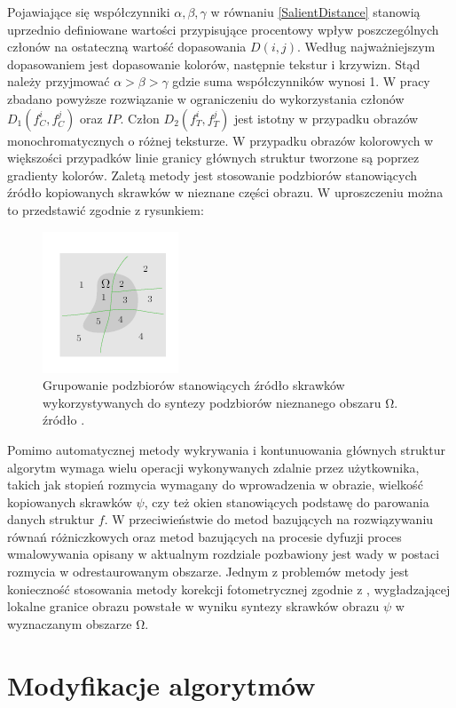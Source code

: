 \documentclass[12pt, twoside, openany]{report}
\theoremstyle{definition}
\begin{document}
Pojawiające się współczynniki $\alpha ,\beta ,\gamma $ w równaniu \eqref{SalientDistance} stanowią uprzednio definiowane wartości przypisujące procentowy wpływ poszczególnych członów na ostateczną wartość dopasowania $D(i,j)$. Według \cite{SalientStrucTexProp} najważniejszym dopasowaniem jest dopasowanie kolorów, następnie tekstur i krzywizn. Stąd należy przyjmować $\alpha >\beta >\gamma $ gdzie suma współczynników wynosi 1. W pracy zbadano powyższe rozwiązanie w ograniczeniu do wykorzystania członów $D_1\left(f^i_C,f^j_C\right)$ oraz $IP$. Człon $D_2\left(f^i_T,f^j_T\right)$ jest istotny w przypadku obrazów monochromatycznych o różnej teksturze. W przypadku obrazów kolorowych w większości przypadków linie granicy głównych struktur tworzone są poprzez gradienty kolorów. Zaletą metody jest stosowanie podzbiorów stanowiących źródło kopiowanych skrawków w nieznane części obrazu. W uproszczeniu można to przedstawić zgodnie z rysunkiem:
\begin{figure}[!h]
	\centering
	\includegraphics[scale=1]{rysunki/4_fig9}
	\caption{Grupowanie podzbiorów stanowiących źródło skrawków wykorzystywanych do syntezy podzbiorów nieznanego obszaru $\boldsymbol{\mathrm{\Omega }}$. źródło \cite{StructurePropagationManual}.}
\label{4_fig9}
\end{figure}
Pomimo automatycznej metody wykrywania i kontunuowania głównych struktur algorytm wymaga wielu operacji wykonywanych zdalnie przez użytkownika, takich jak stopień rozmycia wymagany do wprowadzenia w obrazie, wielkość kopiowanych skrawków $\psi $, czy też okien stanowiących podstawę do parowania danych struktur $f$. W przeciwieństwie do metod bazujących na rozwiązywaniu równań różniczkowych oraz metod bazujących na procesie dyfuzji proces wmalowywania opisany w aktualnym rozdziale pozbawiony jest wady w postaci rozmycia w odrestaurowanym obszarze. Jednym z problemów metody jest konieczność stosowania metody korekcji fotometrycznej zgodnie z \cite{StructurePropagationManual}, wygładzającej lokalne granice obrazu powstałe w wyniku syntezy skrawków obrazu $\psi $ w wyznaczanym obszarze $\mathrm{\Omega }$.
\chapter{Modyfikacje algorytmów}
\end{document}
